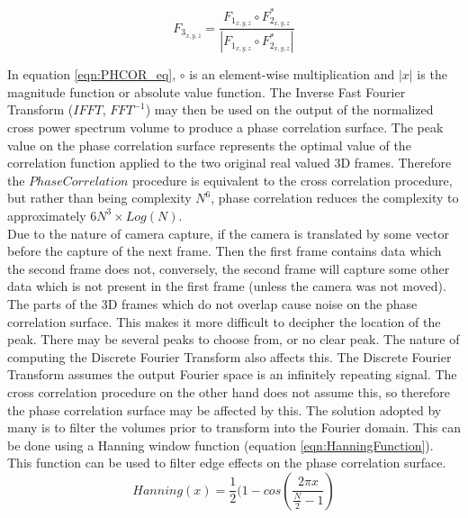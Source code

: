 \begin{equation} \label{eqn:PHCOR_eq}
F_{3_{x,y,z}} = \frac{F_{1_{x,y,z}} \circ F_{2_{x,y,z}}^*}{ | F_{1_{x,y,z}} \circ F_{2_{x,y,z}}^* | }
\end{equation}

In equation \ref{eqn:PHCOR_eq}, $\circ$ is an element-wise multiplication and $|x|$ is the magnitude function or absolute value function. The Inverse Fast Fourier Transform ($IFFT$, $FFT^{-1}$) may then be used on the output of the normalized cross power spectrum volume to produce a phase correlation surface. The peak value on the phase correlation surface represents the optimal value of the correlation function applied to the two original real valued 3D frames. Therefore the $PhaseCorrelation$ procedure is equivalent to the cross correlation procedure, but rather than being complexity $N^6$, phase correlation reduces the complexity to approximately $6N^3 \times Log(N)$. \\


Due to the nature of camera capture, if the camera is translated by some vector before the capture of the next frame. Then the first frame contains data which the second frame does not, conversely, the second frame will capture some other data which is not present in the first frame (unless the camera was not moved). The parts of the 3D frames which do not overlap cause noise on the phase correlation surface. This makes it more difficult to decipher the location of the peak. There may be several peaks to choose from, or no clear peak. The nature of computing the Discrete Fourier Transform also affects this. The Discrete Fourier Transform assumes the output Fourier space is an infinitely repeating signal. The cross correlation procedure on the other hand does not assume this, so therefore the phase correlation surface may be affected by this. The solution adopted by many is to filter the volumes prior to transform into the Fourier domain. This can be done using a Hanning window function (equation \ref{eqn:HanningFunction}). This function can be used to filter edge effects on the phase correlation surface. \\

\begin{equation} \label{eqn:HanningFunction}
Hanning(x) = \frac{1}{2}(1 - cos\left(\frac{2\pi x}{\frac{N}{2} - 1}\right)
\end{equation}

